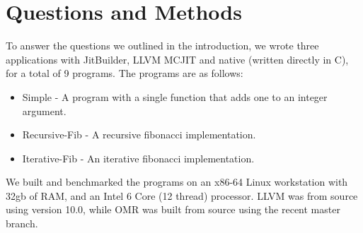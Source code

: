 \section{Questions and Methods}
\label{sec:methodology}
To answer the questions we outlined in the introduction, we wrote three applications with JitBuilder, LLVM MCJIT and native (written directly in C), for a total of 9 programs.
The programs are as follows:
\begin{itemize}
    \item Simple - A program with a single function that adds one to an integer argument.
    \item Recursive-Fib - A recursive fibonacci implementation.
    \item Iterative-Fib - An iterative fibonacci implementation. 
\end{itemize}

We built and benchmarked the programs on an x86-64 Linux workstation with 32gb of RAM, and an Intel 6 Core (12 thread) processor. LLVM was from source using version 10.0\cite{llvmCommit}, while OMR was built from source using the recent master branch\cite{omrCommit}.

